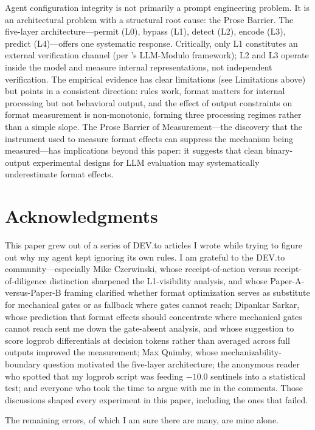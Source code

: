 \documentclass[11pt]{article}
\begin{document}
Agent configuration integrity is not primarily a prompt engineering problem.
It is an architectural problem with a structural root cause: the Prose Barrier.
The five-layer architecture---permit (L0), bypass (L1), detect (L2), encode
(L3), predict (L4)---offers one systematic response. Critically, only L1
constitutes an external verification channel (per \citet{kambhampati2024}'s
LLM-Modulo framework); L2 and L3 operate inside the model and measure internal
representations, not independent verification. The empirical evidence has clear
limitations (see Limitations above) but points in a consistent direction: rules
work, format matters for internal processing but not behavioral output, and the
effect of output constraints on format measurement is non-monotonic, forming
three processing regimes rather than a simple slope. The Prose Barrier of
Measurement---the discovery that the instrument used to measure format effects
can suppress the mechanism being measured---has implications beyond this paper:
it suggests that clean binary-output experimental designs for LLM evaluation may
systematically underestimate format effects.

\section*{Acknowledgments}

This paper grew out of a series of DEV.to articles I wrote while trying to
figure out why my agent kept ignoring its own rules. I am grateful to the
DEV.to community---especially Mike Czerwinski, whose receipt-of-action versus
receipt-of-diligence distinction sharpened the L1-visibility analysis, and
whose Paper-A-versus-Paper-B framing clarified whether format optimization
serves as substitute for mechanical gates or as fallback where gates cannot
reach; Dipankar Sarkar, whose prediction that format effects should
concentrate where mechanical gates cannot reach sent me down the
gate-absent analysis, and whose suggestion to score logprob differentials
at decision tokens rather than averaged across full outputs improved the
measurement; Max Quimby, whose mechanizability-boundary question motivated
the five-layer architecture; the anonymous reader who spotted that my
logprob script was feeding $-10.0$ sentinels into a statistical test; and
everyone who took the time to argue with me in the comments. Those
discussions shaped every experiment in this paper, including the ones
that failed.

The remaining errors, of which I am sure there are many, are mine alone.



\end{document}
